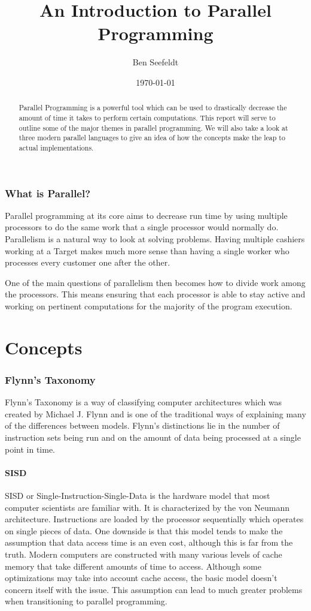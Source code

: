 \documentclass{article}
\author{Ben Seefeldt}
\title{An Introduction to Parallel Programming \\
		\small{\ver}}
\date{\today}
\begin{document}
\maketitle

\begin{abstract}
Parallel Programming is a powerful tool which can be used to drastically decrease the amount of time it takes to perform certain computations. This report will serve to outline some of the major themes in parallel programming. We will also take a look at three modern parallel languages to give an idea of how the concepts make the leap to actual implementations. 
\end{abstract}

  \section{What is Parallel?}
  Parallel programming at its core aims to decrease run time by using multiple processors to do the same work that a single processor would normally do. Parallelism is a natural way to look at solving problems. Having multiple cashiers working at a Target makes much more sense than having a single worker who processes every customer one after the other.
  
  One of the main questions of parallelism then becomes how to divide work among the processors. This means ensuring that each processor is able to stay active and working on pertinent computations for the majority of the program execution.

\part{Concepts}

  \section{Flynn's Taxonomy}
  Flynn's Taxonomy is a way of classifying computer architectures which was created by Michael J. Flynn and is one of the traditional ways of explaining many of the differences between models. Flynn's distinctions lie in the number of instruction sets being run and on the amount of data being processed at a single point in time.
    \subsection{SISD}
    SISD or Single-Instruction-Single-Data is the hardware model that most computer scientists are familiar with. It is characterized by the von Neumann architecture. Instructions are loaded by the processor sequentially which operates on single pieces of data. One downside is that this model tends to make the assumption that data access time is an even cost, although this is far from the truth. Modern computers are constructed with many various levels of cache memory that take different amounts of time to access. Although some optimizations may take into account cache access, the basic model doesn't concern itself with the issue. This assumption can lead to much greater problems when transitioning to parallel programming.
\end{document}
